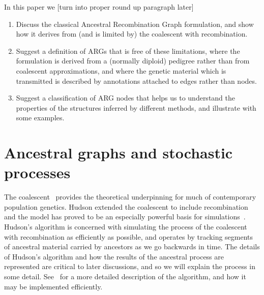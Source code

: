 \documentclass{article}
\begin{document}
In this paper we [turn into proper round up paragraph later]
\begin{enumerate}
\item Discuss the classical Ancestral Recombination Graph formulation,
and show how it derives from (and is limited by) the coalescent with
recombination.
\item Suggest a definition of ARGs that is free of these limitations,
where the formulation is derived from a (normally diploid) pedigree rather than from
coalescent approximations, and where the genetic
material which is transmitted is described by annotations attached to
edges rather than nodes.
\item Suggest a classification of ARG nodes that helps us to understand
the properties of the structures inferred by different methods, and illustrate
with some examples.
\end{enumerate}

\section*{Ancestral graphs and stochastic processes}
The coalescent~\citep{kingman1982coalescent,kingman1982genealogy,
hudson1983testing, tajima1983evolutionary}
provides the theoretical underpinning for much of contemporary population genetics.
Hudson extended the coalescent to include
recombination~\citep{hudson1983properties,hudson1990gene}
and the model has proved to be an especially powerful basis for
simulations~\citep{hudson2002generating,baumdicker2021efficient}.
Hudson's algorithm is concerned with simulating the process of
the coalescent with recombination as efficiently as possible, and operates by
tracking segments of ancestral material carried by ancestors as
we go backwards in time. The details of Hudson's algorithm and how the
results of the ancestral process are represented are critical to later
discussions, and so we will explain the process in some detail.
See~\cite{kelleher2016efficient} for a more detailed
description of the algorithm, and how it may be implemented efficiently.
\end{document}
